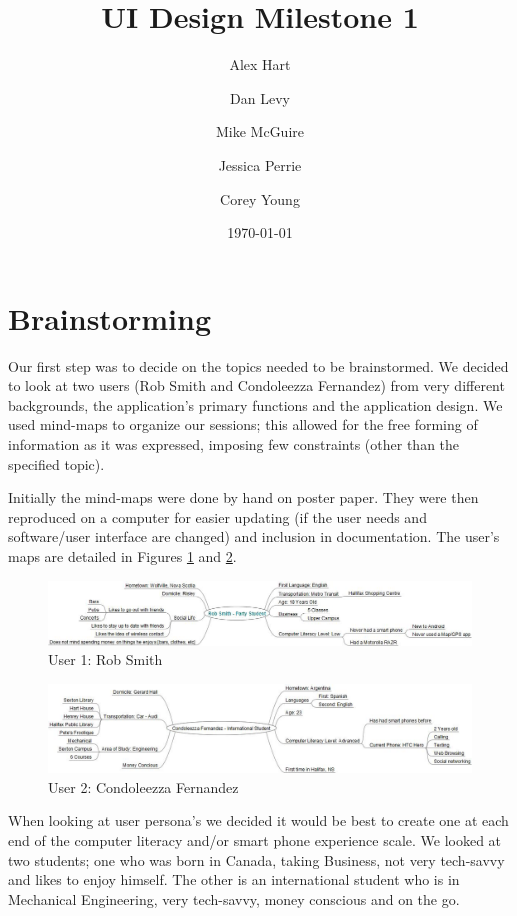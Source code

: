 \documentclass{article}
\title{UI Design Milestone 1}
\author{
    Alex Hart \and Dan Levy \and Mike McGuire
    \and Jessica Perrie \and Corey Young 
}
\date{\today}
\begin{document}
\maketitle

\section{Brainstorming}
Our first step was to decide on the topics needed to be brainstormed. We decided
to look at two users (Rob Smith and Condoleezza Fernandez) from very different
backgrounds, the application's primary functions and the application design.
We used mind-maps to organize our sessions; this allowed for the free forming of
information as it was expressed, imposing few constraints (other than the
specified topic). 

Initially the mind-maps were done by hand on poster paper. They were then
reproduced on a computer for easier updating (if the user needs and software/user
interface are changed) and inclusion in documentation. The user's maps are
detailed in Figures \ref{fig:user1} and \ref{fig:user2}.

\begin{figure}[h!]
\includegraphics[width=\textwidth]{img/Rob.jpg}
\caption{User 1: Rob Smith}
\label{fig:user1}
\end{figure}

\begin{figure}[h!]
\includegraphics[width=\textwidth]{img/Condoleezza.jpg}
\caption{User 2: Condoleezza Fernandez}
\label{fig:user2}
\end{figure}

When looking at user persona's we decided it would be best to create one at each
end of the computer literacy and/or smart phone experience scale. We looked at
two students; one who was born in Canada, taking Business, not very tech-savvy
and likes to enjoy himself. The other is an international student who is in
Mechanical Engineering, very tech-savvy, money conscious and on the go.
\end{document}

